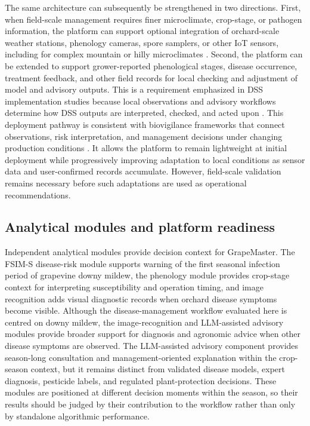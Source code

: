 \documentclass[12pt]{article}
\begin{document}
The same architecture can subsequently be strengthened in two directions. First, when field-scale management requires finer microclimate, crop-stage, or pathogen information, the platform can support optional integration of orchard-scale weather stations, phenology cameras, spore samplers, or other IoT sensors, including for complex mountain or hilly microclimates \citep{bakirScalableEndtoendIoT2026,nkwochaEndtoendDigitalFramework2025,brischettoCanSporeSampler2020,raiAdvancingSitespecificDisease2026}. Second, the platform can be extended to support grower-reported phenological stages, disease occurrence, treatment feedback, and other field records for local checking and adjustment of model and advisory outputs. This is a requirement emphasized in DSS implementation studies because local observations and advisory workflows determine how DSS outputs are interpreted, checked, and acted upon \citep{rossiAddressingImplementationProblem2014,seemForecastingPlantDisease2004,gonzalez-dominguezPlantDiseaseModels2023}. This deployment pathway is consistent with biovigilance frameworks that connect observations, risk interpretation, and management decisions under changing production conditions \citep{carisseUsingBiovigilanceApproach2017}. It allows the platform to remain lightweight at initial deployment while progressively improving adaptation to local conditions as sensor data and user-confirmed records accumulate. However, field-scale validation remains necessary before such adaptations are used as operational recommendations.

\subsection{Analytical modules and platform readiness}\label{modular-analytical-components-in-the-crop-season-workflow}

Independent analytical modules provide decision context for GrapeMaster. The FSIM-S disease-risk module supports warning of the first seasonal infection period of grapevine downy mildew, the phenology module provides crop-stage context for interpreting susceptibility and operation timing, and image recognition adds visual diagnostic records when orchard disease symptoms become visible. Although the disease-management workflow evaluated here is centred on downy mildew, the image-recognition and LLM-assisted advisory modules provide broader support for diagnosis and agronomic advice when other disease symptoms are observed. The LLM-assisted advisory component provides season-long consultation and management-oriented explanation within the crop-season context, but it remains distinct from validated disease models, expert diagnosis, pesticide labels, and regulated plant-protection decisions. These modules are positioned at different decision moments within the season, so their results should be judged by their contribution to the workflow rather than only by standalone algorithmic performance.
\end{document}

